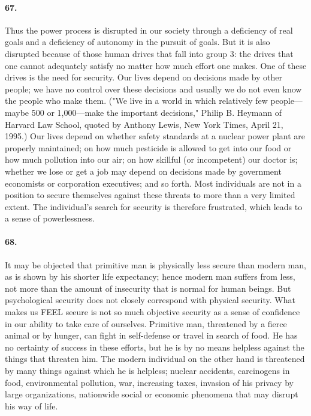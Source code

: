 \documentclass[12pt]{book}
\begin{document}
\paragraph{67.} Thus the power process is disrupted in our society through a deficiency of real goals and a deficiency of autonomy in the pursuit of goals.  But it is also disrupted because of those human drives that fall into group 3: the drives that one cannot adequately satisfy no matter how much effort one makes. One of these drives is the need for security. Our lives depend on decisions made by other people; we have no control over these decisions and usually we do not even know the people who make them. ("We live in a world in which relatively few people---maybe 500 or 1,000---make the important decisions," Philip B. Heymann of Harvard Law School, quoted by Anthony Lewis, New York Times, April 21, 1995.) Our lives depend on whether safety standards at a nuclear power plant are properly maintained; on how much pesticide is allowed to get into our food or how much pollution into our air; on how skillful (or incompetent) our doctor is; whether we lose or get a job may depend on decisions made by government economists or corporation executives; and so forth. Most individuals are not in a position to secure themselves against these threats to more than a very limited extent. The individual's search for security is therefore frustrated, which leads to a sense of powerlessness.


\paragraph{68.} It may be objected that primitive man is physically less secure than modern man, as is shown by his shorter life expectancy; hence modern man suffers from less, not more than the amount of insecurity that is normal for human beings. But psychological security does not closely correspond with physical security. What makes us FEEL seeure is not so much objective security as a sense of confidence in our ability to take care of ourselves.  Primitive man, threatened by a fierce animal or by hunger, can fight in self-defense or travel in search of food. He has no certainty of success in these efforts, but he is by no means helpless against the things that threaten him. The modern individual on the other hand is threatened by many things against which he is helpless; nuclear accidents, carcinogens in food, environmental pollution, war, increasing taxes, invasion of his privacy by large organizations, nationwide social or economic phenomena that may disrupt his way of life.
\end{document}
